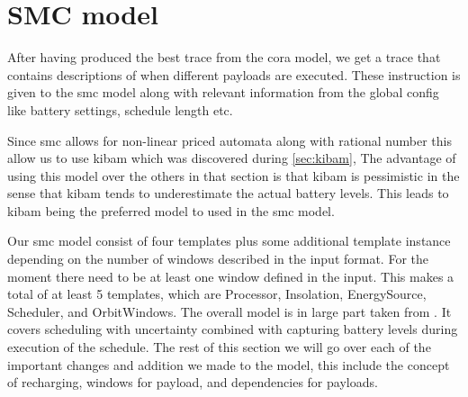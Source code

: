 \section{SMC model} \label{sec:smc_model}
After having produced the best trace from the \gls{cora} model, we get a trace that contains descriptions of when different payloads are executed. These instruction is given to the \gls{smc} model along with relevant information from the global config like battery settings, schedule length etc.

Since \gls{smc} allows for non-linear priced automata along with rational number this allow us to use \gls{kibam} which was discovered during \cref{sec:kibam}, The advantage of using this model over the others in that section is that \gls{kibam} is pessimistic in the sense that \gls{kibam} tends to underestimate the actual battery levels. This leads to \gls{kibam} being the preferred model to used in the \gls{smc} model.

Our \gls{smc} model consist of four templates plus some additional template instance depending on the number of windows described in the input format. For the moment there need to be at least one window defined in the input. This makes a total of at least 5 templates, which are Processor, Insolation, EnergySource, Scheduler, and OrbitWindows. 
The overall model is in large part taken from \cite{battery_aware_scheduling}. It covers scheduling with uncertainty combined with capturing battery levels during execution of the schedule. The rest of this section we will go over each of the important changes and addition we made to the model, this include the concept of recharging, windows for payload, and dependencies for payloads. 

